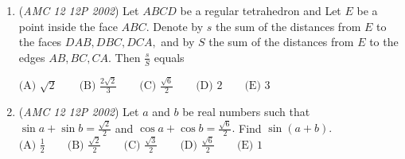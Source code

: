 \begin{enumerate}
	\item (\textit{AMC 12 12P 2002}) Let $ABCD$ be a regular tetrahedron and Let $E$ be a point inside the face $ABC.$ Denote by $s$ the sum of the distances from $E$ to the faces $DAB, DBC, DCA,$ and by $S$ the sum of the distances from $E$ to the edges $AB, BC, CA.$ Then $\frac{s}{S}$ equals


 $\text{(A) }\sqrt{2} \qquad \text{(B) }\frac{2 \sqrt{2}}{3} \qquad \text{(C) }\frac{\sqrt{6}}{2} \qquad \text{(D) }2 \qquad \text{(E) }3$


	\item (\textit{AMC 12 12P 2002}) Let $a$ and $b$ be real numbers such that $\sin{a} + \sin{b} = \frac{\sqrt{2}}{2}$ and $\cos {a} + \cos {b} = \frac{\sqrt{6}}{2}.$ Find $\sin{(a+b)}.$
$\text{(A) }\frac{1}{2} \qquad \text{(B) }\frac{\sqrt{2}}{2} \qquad \text{(C) }\frac{\sqrt{3}}{2} \qquad \text{(D) }\frac{\sqrt{6}}{2} \qquad \text{(E) }1$


\end{enumerate}